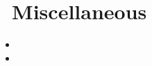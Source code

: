 \documentclass{resume}
\newcommand{\en}[1]{#1}
\newcommand{\zh}[1]{}
\begin{document}
\section{\faInfo\ \en{Miscellaneous}\zh{杂项}}
\begin{itemize}[parsep=0.5ex]
      \item \en{}
            \zh{喜欢折腾,搭建过 Gitea、Minio、Grafana 等服务}
      \item \en{}
            \zh{热爱写代码和了解有趣的知识,喜欢实现小项目(手写Git,简单全文搜索引擎,简单 BitTorrent 下载器,Bot 工具,静态博客生成器,DNS 服务器，实现 Tokei 等等)}

\end{itemize}
\end{document}
